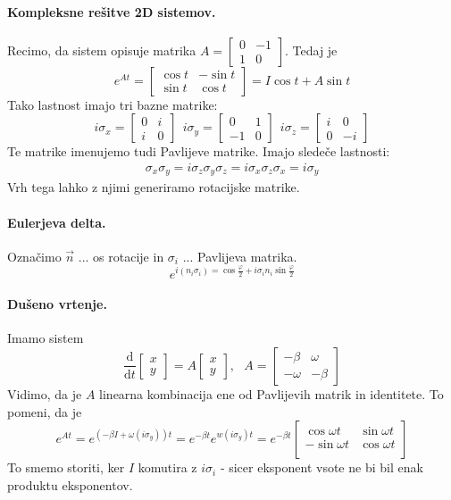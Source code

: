 \documentclass[a4paper]{article}
\newcommand{\vct}[1]{\overrightarrow{#1}}
\newcommand{\dd}[2]{\frac{\mathrm{d} {#1}}{\mathrm{d} {#2}}}
\begin{document}
\paragraph{Kompleksne rešitve 2D sistemov.} Recimo, da sistem opisuje matrika $\displaystyle{A = \begin{bmatrix}
    0 & -1 \\
    1 & 0
\end{bmatrix}}$. Tedaj je $$e^{At} = \begin{bmatrix}
    \cos t & -\sin t \\
    \sin t & \cos t
\end{bmatrix} = I\cos t + A \sin t$$
Tako lastnost imajo tri bazne matrike:
$$i\sigma_x = \begin{bmatrix}
    0 & i \\
    i & 0
\end{bmatrix}~~i\sigma_y = \begin{bmatrix}
    0 & 1 \\
    -1 & 0
\end{bmatrix}~~i\sigma_z = \begin{bmatrix}
    i & 0 \\
    0 & -i
\end{bmatrix}$$
Te matrike imenujemo tudi Pavlijeve matrike. Imajo sledeče lastnosti:
\begin{eqnarray*}
    \sigma_x\sigma_y = i\sigma_z
    \sigma_y\sigma_z = i\sigma_x
    \sigma_z\sigma_x = i\sigma_y
\end{eqnarray*}
Vrh tega lahko z njimi generiramo rotacijske matrike.
\paragraph{Eulerjeva delta.} Označimo $\vct{n}$ ... os rotacije in $\sigma_i$ ... Pavlijeva matrika.
$$e^{i(n_i\sigma_i) = \cos\frac{\varphi}{2} + i\sigma_i n_i \sin\frac{\varphi}{2}}$$
\paragraph{Dušeno vrtenje.} Imamo sistem
$$\dd{}{t} \begin{bmatrix}
    x \\ y
\end{bmatrix} = A \begin{bmatrix}
    x \\ y
\end{bmatrix},~~~A = \begin{bmatrix}
    -\beta & \omega \\
    -\omega & -\beta
\end{bmatrix}$$
Vidimo, da je $A$ linearna kombinacija ene od Pavlijevih matrik in identitete. To pomeni, da je
$$e^{At} = e^{(-\beta I + \omega(i\sigma_y))t} = e^{-\beta t} e^{w(i\sigma_y)t} = e^{-\beta t} \begin{bmatrix}
    \cos \omega t & \sin \omega t \\
    - \sin \omega t & \cos \omega t \\
\end{bmatrix}$$
To smemo storiti, ker $I$ komutira z $i\sigma_i$ - sicer eksponent vsote ne bi bil enak produktu eksponentov.
\end{document}
